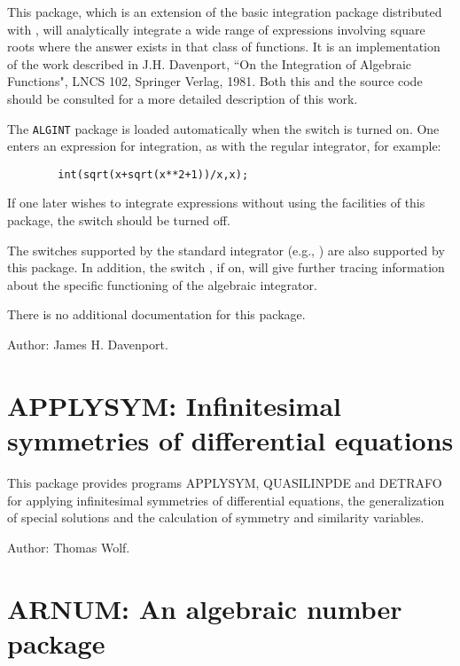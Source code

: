 This package, which is an extension of the basic integration package
distributed with {\REDUCE}, will analytically integrate a wide range of
expressions involving square roots where the answer exists in that class
of functions. It is an implementation of the work described in J.H.
Davenport, ``On the Integration of Algebraic Functions", LNCS 102,
Springer Verlag, 1981.  Both this and the source code should be consulted
for a more detailed description of this work.

\hypertarget{switch:ALGINT}{}
The \texttt{ALGINT} package is loaded automatically when the switch 
is turned on.  
One enters an expression for integration, as with the regular integrator,
for example:
\begin{verbatim}
        int(sqrt(x+sqrt(x**2+1))/x,x);
\end{verbatim}
If one later wishes to integrate expressions without using the facilities of
this package, the switch   should be turned
off. 

\hypertarget{switch:TRA}{}
The switches supported by the standard integrator (e.g., )
 are also supported by this package.  In addition, the
switch ,  if on, will give further tracing
information about the specific functioning of the algebraic integrator.

There is no additional documentation for this package.

Author: James H. Davenport.

\newpage

\section{APPLYSYM: Infinitesimal symmetries of differential equations}

This package provides programs APPLYSYM, QUASILINPDE and DETRAFO for
applying infinitesimal symmetries of differential equations, the
generalization of special solutions and the calculation of symmetry and
similarity variables.

Author: Thomas Wolf.


\newpage

\section{ARNUM: An algebraic number package} 
\label{sec:package-arnum}


